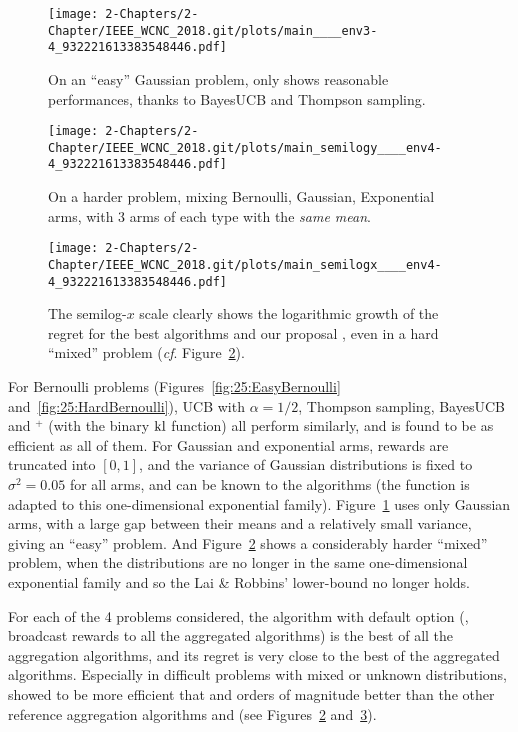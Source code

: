 \begin{figure}[h!]  %
	\centering
	\texttt{[image: 2-Chapters/2-Chapter/IEEE\_WCNC\_2018.git/plots/main\_\_\_\_env3-4\_932221613383548446.pdf]}
	\caption{On an ``easy'' Gaussian problem, only \Aggr{} shows reasonable performances, thanks to BayesUCB and Thompson sampling.}
	\label{fig:25:EasyGaussian}
\end{figure}

\begin{figure}[h!]  %
	\centering
	\texttt{[image: 2-Chapters/2-Chapter/IEEE\_WCNC\_2018.git/plots/main\_semilogy\_\_\_\_env4-4\_932221613383548446.pdf]}
	\caption{On a harder problem, mixing Bernoulli, Gaussian, Exponential arms, with 3 arms of each type with the \emph{same mean}.}
	\label{fig:25:HarderMixed}
\end{figure}

\begin{figure}[h!]  %
	\centering
	\texttt{[image: 2-Chapters/2-Chapter/IEEE\_WCNC\_2018.git/plots/main\_semilogx\_\_\_\_env4-4\_932221613383548446.pdf]}
	\caption{The semilog-$x$ scale clearly shows the logarithmic growth of the regret for the best algorithms and our proposal \Aggr, even in a hard ``mixed'' problem (\emph{cf}. Figure~\ref{fig:25:HarderMixed}).}
	\label{fig:25:HarderMixed_semilogx}
\end{figure}

For Bernoulli problems (Figures~\ref{fig:25:EasyBernoulli} and~\ref{fig:25:HardBernoulli}), UCB with $\alpha=1/2$, Thompson sampling, BayesUCB and \klUCB{}$^+$ (with the binary $\mathrm{kl}$ function) all perform similarly, and \Aggr{} is found to be as efficient as all of them.
For Gaussian and exponential arms, rewards are truncated into $[0,1]$, and the variance of Gaussian distributions is fixed to $\sigma^2 = 0.05$ for all arms, and can be known to the algorithms (the \kl{} function is adapted to this one-dimensional exponential family).
%
Figure~\ref{fig:25:EasyGaussian} uses only Gaussian arms, with a large gap between their means and a relatively small variance, giving an ``easy'' problem.
%
And Figure~\ref{fig:25:HarderMixed} shows a considerably harder ``mixed'' problem, when the distributions are no longer in the same one-dimensional exponential family and so the Lai \& Robbins' lower-bound no longer holds.

For each of the 4 problems considered, the \Aggr{} algorithm with default option (\ie, broadcast rewards to all the aggregated algorithms) is the best of all the aggregation algorithms,
and its regret is very close to the best of the aggregated algorithms.
Especially in difficult problems with mixed or unknown distributions, \Aggr{} showed to be more efficient that \ExpQ{} and orders of magnitude better than the other reference aggregation algorithms \LearnExp{} and \CORRAL{} (see Figures~\ref{fig:25:HarderMixed} and~\ref{fig:25:HarderMixed_semilogx}).


